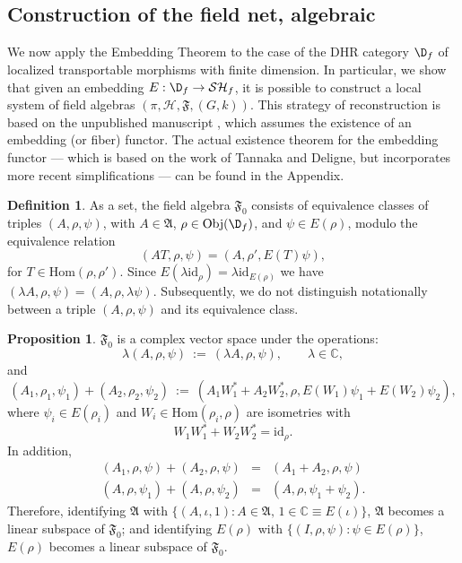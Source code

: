 \documentclass[11pt]{article}
\newcommand{\alg}[1]{\mathfrak{#1}}
\theoremstyle{definition}
\newtheorem{prop}[thm]{Proposition}
\theoremstyle{definition}
\newtheorem{defn}[thm]{Definition}
\theoremstyle{remark}
\newcommand{\Obj}{\mathrm{Obj}}
\def\2#1{{\mathcal #1}}
\def\7#1{{\mathbb #1}}
\newcommand{\Hom}{\mathrm{Hom}}
\def\id{\mathrm{id}}
\newcommand{\fields}{(\pi ,\2H ,\alg{F},(G,k))}
\begin{document}
\subsection{Construction of the field net, algebraic} \label{ss-Falg}

We now apply the Embedding Theorem to the case of the DHR category $\D
_f$ of localized transportable morphisms with finite dimension.  In
particular, we show that given an embedding $E:\D _f\to \2S\2H_f$, it
is possible to construct a local system of field algebras $\fields$.
This strategy of reconstruction is based on the unpublished manuscript
\cite{problem}, which assumes the existence of an embedding (or fiber)
functor.  The actual existence theorem for the embedding functor ---
which is based on the work of Tannaka and Deligne, but incorporates
more recent simplifications --- can be found in the Appendix.

\begin{defn} As a set, the field algebra $\alg{F}_0 $
  consists of equivalence classes of triples $(A,\rho
  ,\psi)$, with $A\in \alg{A}$, $\rho \in \Obj (\D
  _f)$, and $\psi \in E(\rho )$, modulo the equivalence
  relation
$$ (AT,\rho ,\psi )=(A,\rho ',E(T)\psi ) ,$$
for $T\in \Hom (\rho ,\rho ')$.  Since $E(\lambda \id _{\rho})=\lambda \id _{E(\rho
  )}$ we have $(\lambda A,\rho ,\psi )=(A,\rho ,\lambda \psi )$.  Subsequently, we do
not distinguish notationally between a triple $(A,\rho ,\psi )$ and its equivalence
class.
\end{defn}

\begin{prop} $\alg{F}_0 $ is a complex vector space under the operations:
  \begin{equation} \lambda (A,\rho ,\psi )\: := \:(\lambda A,\rho ,\psi ) ,\qquad
    \lambda \in \7C ,\end{equation} and
  \begin{equation} (A_1,\rho _1,\psi_1)+(A_2,\rho _2,\psi _2)\: :=
    \:(A_1W_1^*+A_2W_2^*,\rho ,E(W_1)\psi _1+E(W_2)\psi _2), \label{addition}
  \end{equation} where $\psi _i\in E(\rho _i)$ and $W_i\in \Hom (\rho _i ,\rho )$ are
  isometries with
  \begin{equation} W_1W_1^*+W_2W_2^*=\id _\rho .\end{equation} In addition,  
  \begin{eqnarray*} (A_1,\rho ,\psi )+(A_2,\rho ,\psi )&=&(A_1+A_2,\rho ,\psi ) \\
    (A,\rho ,\psi _1)+(A,\rho ,\psi _2) &=&(A,\rho ,\psi _1+\psi _2) .\end{eqnarray*}
  Therefore, identifying $\alg{A}$ with $\{ (A,\iota ,1):A\in \alg{A}, \, 1\in
  \7C\equiv E(\iota )\}$, $\alg{A}$ becomes a linear subspace of $\alg{F}_0 $; and
  identifying $E(\rho)$ with $\{ (I,\rho ,\psi ):\psi \in E(\rho )\}$, $E(\rho )$
  becomes a linear subspace of $\alg{F}_0$.
\label{linear-space}
\end{prop}
\end{document}
